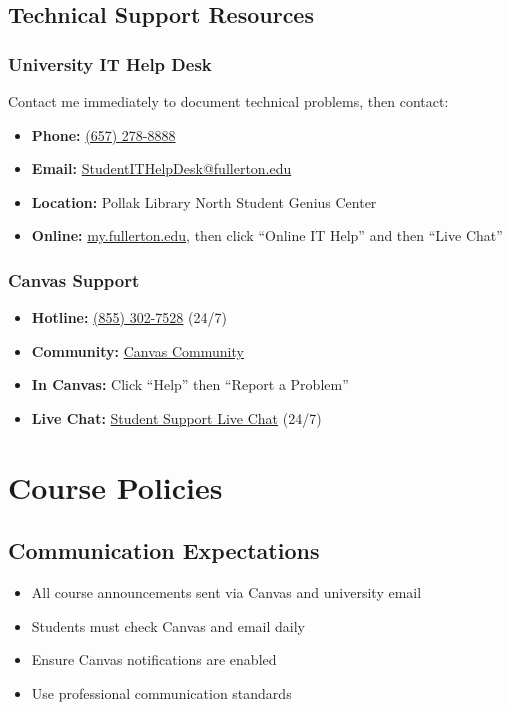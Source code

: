 \documentclass[11pt]{scrartcl} %
\begin{document}
\subsection{Technical Support Resources}

\subsubsection{University IT Help Desk}
Contact me immediately to document technical problems, then contact:
\begin{itemize}
\item \textbf{Phone:} \href{tel:+16572788888}{(657) 278-8888}
\item \textbf{Email:} \href{mailto:StudentITHelpDesk@fullerton.edu}{StudentITHelpDesk@fullerton.edu}
\item \textbf{Location:} Pollak Library North Student Genius Center
\item \textbf{Online:} \href{http://my.fullerton.edu/}{my.fullerton.edu}, then click ``Online IT Help'' and then ``Live Chat''
\end{itemize}

\subsubsection{Canvas Support}
\begin{itemize}
\item \textbf{Hotline:} \href{tel:+18553027528}{(855) 302-7528} (24/7)
\item \textbf{Community:} \href{https://community.canvaslms.com/docs/DOC-10720-67952720329}{Canvas Community}
\item \textbf{In Canvas:} Click ``Help'' then ``Report a Problem''
\item \textbf{Live Chat:} \href{https://cases.canvaslms.com/liveagentchat?chattype=student&sfid=001A000000YzcwQIAR}{Student Support Live Chat} (24/7)
\end{itemize}

\section{Course Policies}

\subsection{Communication Expectations}
\begin{itemize}
\item All course announcements sent via Canvas and university email
\item Students must check Canvas and email daily
\item Ensure Canvas notifications are enabled
\item Use professional communication standards
\end{itemize}
\end{document}
